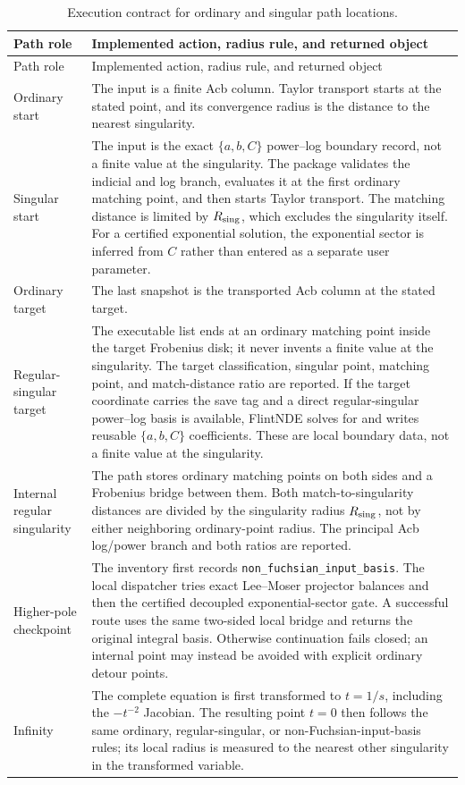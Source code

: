\documentclass[11pt]{article}
\begin{document}
\small
\begin{longtable}{L{0.22\textwidth}L{0.72\textwidth}}
\caption{Execution contract for ordinary and singular path locations.}
\label{tab:path-location-contract}\\
\toprule
Path role & Implemented action, radius rule, and returned object \\
\midrule
\endfirsthead
\toprule
Path role & Implemented action, radius rule, and returned object \\
\midrule
\endhead
Ordinary start & The input is a finite Acb column.  Taylor transport starts at the stated
point, and its convergence radius is the distance to the nearest singularity. \\
Singular start & The input is the exact $\{a,b,C\}$ power--log boundary record, not a finite
value at the singularity.  The package validates the indicial and log branch, evaluates it
at the first ordinary matching point, and then starts Taylor transport.  The matching
distance is limited by $R_{\rm sing}$, which excludes the singularity itself.  For a
certified exponential solution, the exponential sector is inferred from $C$ rather than
entered as a separate user parameter. \\
Ordinary target & The last snapshot is the transported Acb column at the stated target. \\
Regular-singular target & The executable list ends at an ordinary matching point inside the
target Frobenius disk; it never invents a finite value at the singularity.  The target
classification, singular point, matching point, and match-distance ratio are reported.  If
the target coordinate carries the save tag and a direct regular-singular power--log basis is
available, FlintNDE solves for and writes reusable $\{a,b,C\}$ coefficients.  These are local
boundary data, not a finite value at the singularity. \\
Internal regular singularity & The path stores ordinary matching points on both sides and a
Frobenius bridge between them.  Both match-to-singularity distances are divided by the
singularity radius $R_{\rm sing}$, not by either neighboring ordinary-point radius.  The
principal Acb log/power branch and both ratios are reported. \\
Higher-pole checkpoint & The inventory first records
\texttt{non\_fuchsian\_input\_basis}.  The local dispatcher tries exact Lee--Moser
projector balances and then the certified decoupled exponential-sector gate.
A successful route uses
the same two-sided local bridge and returns the original integral basis.  Otherwise
continuation fails closed; an internal point may instead be avoided with explicit ordinary
detour points. \\
Infinity & The complete equation is first transformed to $t=1/s$, including the
$-t^{-2}$ Jacobian.  The resulting point $t=0$ then follows the same ordinary,
regular-singular, or non-Fuchsian-input-basis rules; its local radius is measured to the
nearest other singularity in the transformed variable. \\
\bottomrule
\end{longtable}
\normalsize
\end{document}
